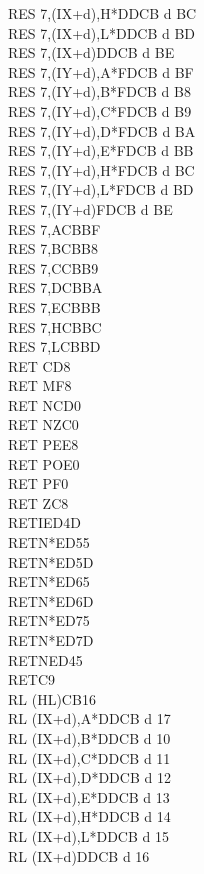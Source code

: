 \documentclass[oneside,a4paper]{book}
\begin{document}
\begin{multicols}{3}
{\begin{tabbing}
RES 7,(IX+d),H*\>DDCB d BC\\
RES 7,(IX+d),L*\>DDCB d BD\\
RES 7,(IX+d)\>DDCB d BE\\
RES 7,(IY+d),A*\>FDCB d BF\\
RES 7,(IY+d),B*\>FDCB d B8\\
RES 7,(IY+d),C*\>FDCB d B9\\
RES 7,(IY+d),D*\>FDCB d BA\\
RES 7,(IY+d),E*\>FDCB d BB\\
RES 7,(IY+d),H*\>FDCB d BC\\
RES 7,(IY+d),L*\>FDCB d BD\\
RES 7,(IY+d)\>FDCB d BE\\
RES 7,A\>CBBF\\
RES 7,B\>CBB8\\
RES 7,C\>CBB9\\
RES 7,D\>CBBA\\
RES 7,E\>CBBB\\
RES 7,H\>CBBC\\
RES 7,L\>CBBD\\
RET C\>D8\\
RET M\>F8\\
RET NC\>D0\\
RET NZ\>C0\\
RET PE\>E8\\
RET PO\>E0\\
RET P\>F0\\
RET Z\>C8\\
RETI\>ED4D\\
RETN*\>ED55\\
RETN*\>ED5D\\
RETN*\>ED65\\
RETN*\>ED6D\\
RETN*\>ED75\\
RETN*\>ED7D\\
RETN\>ED45\\
RET\>C9\\
RL (HL)\>CB16\\
RL (IX+d),A*\>DDCB d 17\\
RL (IX+d),B*\>DDCB d 10\\
RL (IX+d),C*\>DDCB d 11\\
RL (IX+d),D*\>DDCB d 12\\
RL (IX+d),E*\>DDCB d 13\\
RL (IX+d),H*\>DDCB d 14\\
RL (IX+d),L*\>DDCB d 15\\
RL (IX+d)\>DDCB d 16\\

\end{tabbing}}
\end{multicols}
\end{document}
